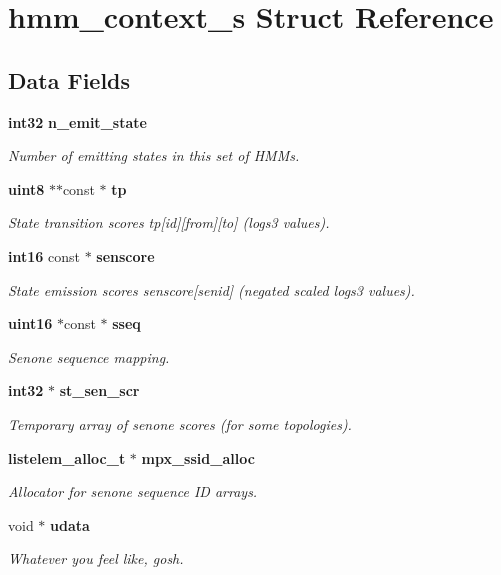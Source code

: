 \section{hmm\-\_\-context\-\_\-s \-Struct \-Reference}
\label{structhmm__context__s}
\subsection*{\-Data \-Fields}
\begin{DoxyCompactItemize}
\item 
{\bf int32} {\bf n\-\_\-emit\-\_\-state}
\begin{DoxyCompactList}\small\item\em \-Number of emitting states in this set of \-H\-M\-Ms. \end{DoxyCompactList}\item 
{\bf uint8} $\ast$$\ast$const $\ast$ {\bf tp}
\begin{DoxyCompactList}\small\item\em \-State transition scores tp[id][from][to] (logs3 values). \end{DoxyCompactList}\item 
{\bf int16} const $\ast$ {\bf senscore}
\begin{DoxyCompactList}\small\item\em \-State emission scores senscore[senid] (negated scaled logs3 values). \end{DoxyCompactList}\item 
{\bf uint16} $\ast$const $\ast$ {\bf sseq}
\begin{DoxyCompactList}\small\item\em \-Senone sequence mapping. \end{DoxyCompactList}\item 
{\bf int32} $\ast$ {\bf st\-\_\-sen\-\_\-scr}
\begin{DoxyCompactList}\small\item\em \-Temporary array of senone scores (for some topologies). \end{DoxyCompactList}\item 
{\bf listelem\-\_\-alloc\-\_\-t} $\ast$ {\bf mpx\-\_\-ssid\-\_\-alloc}
\begin{DoxyCompactList}\small\item\em \-Allocator for senone sequence \-I\-D arrays. \end{DoxyCompactList}\item 
void $\ast$ {\bf udata}
\begin{DoxyCompactList}\small\item\em \-Whatever you feel like, gosh. \end{DoxyCompactList}\end{DoxyCompactItemize}


